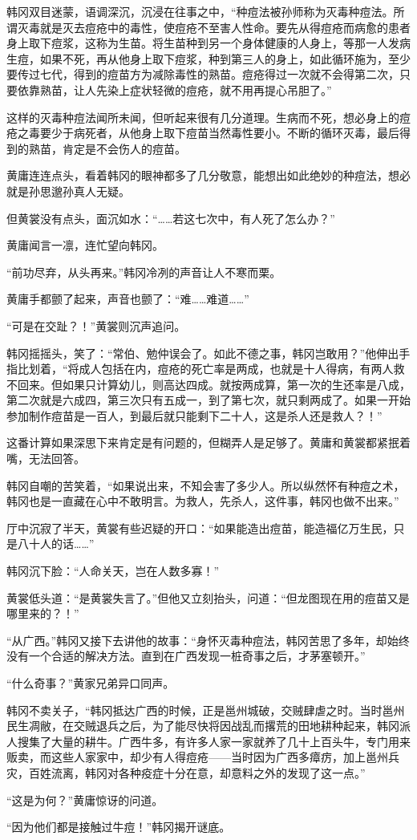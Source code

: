 韩冈双目迷蒙，语调深沉，沉浸在往事之中，“种痘法被孙师称为灭毒种痘法。所谓灭毒就是灭去痘疮中的毒性，使痘疮不至害人性命。要先从得痘疮而病愈的患者身上取下痘浆，这称为生苗。将生苗种到另一个身体健康的人身上，等那一人发病生痘，如果不死，再从他身上取下痘浆，种到第三人的身上，如此循环施为，至少要传过七代，得到的痘苗方为减除毒性的熟苗。痘疮得过一次就不会得第二次，只要依靠熟苗，让人先染上症状轻微的痘疮，就不用再提心吊胆了。”

这样的灭毒种痘法闻所未闻，但听起来很有几分道理。生病而不死，想必身上的痘疮之毒要少于病死者，从他身上取下痘苗当然毒性要小。不断的循环灭毒，最后得到的熟苗，肯定是不会伤人的痘苗。

黄庸连连点头，看着韩冈的眼神都多了几分敬意，能想出如此绝妙的种痘法，想必就是孙思邈孙真人无疑。

但黄裳没有点头，面沉如水：“……若这七次中，有人死了怎么办？”

黄庸闻言一凛，连忙望向韩冈。

“前功尽弃，从头再来。”韩冈冷冽的声音让人不寒而栗。

黄庸手都颤了起来，声音也颤了：“难……难道……”

“可是在交趾？！”黄裳则沉声追问。

韩冈摇摇头，笑了：“常伯、勉仲误会了。如此不德之事，韩冈岂敢用？”他伸出手指比划着，“将成人包括在内，痘疮的死亡率是两成，也就是十人得病，有两人救不回来。但如果只计算幼儿，则高达四成。就按两成算，第一次的生还率是八成，第二次就是六成四，第三次只有五成一，到了第七次，就只剩两成了。如果一开始参加制作痘苗是一百人，到最后就只能剩下二十人，这是杀人还是救人？！”

这番计算如果深思下来肯定是有问题的，但糊弄人是足够了。黄庸和黄裳都紧抿着嘴，无法回答。

韩冈自嘲的苦笑着，“如果说出来，不知会害了多少人。所以纵然怀有种痘之术，韩冈也是一直藏在心中不敢明言。为救人，先杀人，这件事，韩冈也做不出来。”

厅中沉寂了半天，黄裳有些迟疑的开口：“如果能造出痘苗，能造福亿万生民，只是八十人的话……”

韩冈沉下脸：“人命关天，岂在人数多寡！”

黄裳低头道：“是黄裳失言了。”但他又立刻抬头，问道：“但龙图现在用的痘苗又是哪里来的？！”

“从广西。”韩冈又接下去讲他的故事：“身怀灭毒种痘法，韩冈苦思了多年，却始终没有一个合适的解决方法。直到在广西发现一桩奇事之后，才茅塞顿开。”

“什么奇事？”黄家兄弟异口同声。

韩冈不卖关子，“韩冈抵达广西的时候，正是邕州城破，交贼肆虐之时。当时邕州民生凋敝，在交贼退兵之后，为了能尽快将因战乱而撂荒的田地耕种起来，韩冈派人搜集了大量的耕牛。广西牛多，有许多人家一家就养了几十上百头牛，专门用来贩卖，而这些人家家中，却少有人得痘疮——当时因为广西多瘴疠，加上邕州兵灾，百姓流离，韩冈对各种疫症十分在意，却意料之外的发现了这一点。”

“这是为何？”黄庸惊讶的问道。

“因为他们都是接触过牛痘！”韩冈揭开谜底。

